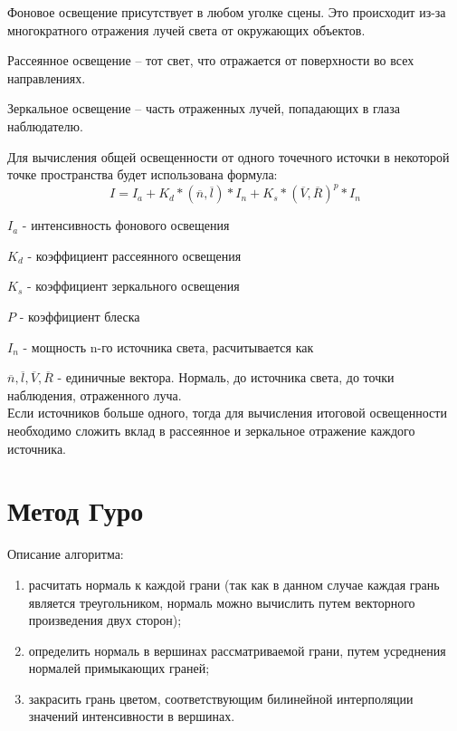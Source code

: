 \documentclass[12pt]{report}
\begin{document}
	Фоновое освещение присутствует в любом уголке сцены. Это происходит из-за многократного отражения лучей света от окружающих объектов. 
		
	Рассеянное освещение – тот свет, что отражается от поверхности во всех направлениях.
	
	Зеркальное освещение – часть отраженных лучей, попадающих в глаза наблюдателю.
	
	Для вычисления общей освещенности от одного точечного источки в некоторой точке пространства будет использована формула:
	\begin{equation}
		I = I_{a} + K_{d}*(\overline{n}, \overline{l})*I_{n} + K_{s}*(\overline{V}, \overline{R})^{p}*I_{n}
	\end{equation}
		
		$I_{a}$ - интенсивность фонового освещения
		
		$K_{d}$ - коэффициент рассеянного освещения
		
		$K_{s}$ - коэффициент зеркального освещения
		
		$P$ - коэффициент блеска
		
		$I_{n}$ - мощность n-го источника света, расчитывается как
		
		$\overline{n}, \overline{l}, \overline{V}, \overline{R}$ - единичные вектора. Нормаль, до источника света, до точки наблюдения, отраженного луча. 
		~\\
		
		Если источников больше одного, тогда для вычисления итоговой освещенности необходимо сложить вклад в рассеянное и зеркальное отражение каждого источника.
	\newpage	
	\section{Метод Гуро}
	
	Описание алгоритма:
	
	\begin{enumerate}
		\item расчитать нормаль к каждой грани (так как в данном случае каждая грань является треугольником, нормаль можно вычислить путем векторного произведения двух сторон);
		\item определить нормаль в вершинах рассматриваемой грани, путем усреднения нормалей примыкающих граней;	
		\item закрасить грань цветом, соответствующим билинейной интерполяции значений интенсивности в вершинах.
	\end{enumerate}
\end{document}

